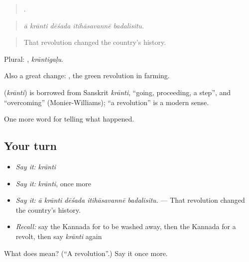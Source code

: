 \begin{quote}
    .
\end{quote}

\begin{quote}
\emph{ā krānti dēśada itihāsavannē badalisitu.}
\end{quote}

\begin{quote}
That revolution changed the country's history.
\end{quote}

Plural: , \emph{krāntigaḷu}.

Also a great change:  , the green revolution in farming.

\begin{cousinweb}
\textbf{} (\emph{krānti}) is borrowed from Sanskrit \emph{krānti}, \textquotedblleft{}going, proceeding, a step\textquotedblright{}, and \textquotedblleft{}overcoming\textquotedblright{} (Monier-Williams); \textquotedblleft{}a revolution\textquotedblright{} is a modern sense.
\end{cousinweb}

\begin{grammarlens}[title={What you've built}]
One more word for telling what happened.
\end{grammarlens}

\subsection*{Your turn}
\begin{itemize}
\raggedright
  \item \emph{Say it:} \emph{krānti}
  \item \emph{Say it:} \emph{krānti}, once more
  \item \emph{Say it:} \emph{ā krānti dēśada itihāsavannē badalisitu.} — That revolution changed the country's history.
  \item \emph{Recall:} say the Kannada for to be washed away, then the Kannada for a revolt, then say \emph{krānti} again
\end{itemize}

\begin{tcolorbox}[breakable,colback=teal!4,colframe=teal!35!black,title={Before you move on}]
What does  mean? (\textquotedblleft{}A revolution\textquotedblright{}.) Say it once more.
\end{tcolorbox}
